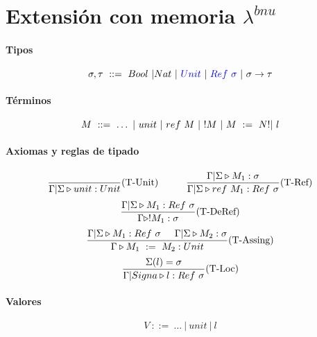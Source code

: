 \documentclass[10pt,a4paper]{article}
\begin{document}
\newpage
\section{Extensión con memoria $\lambda^{bnu}$}
\paragraph{Tipos}
$$\sigma, \tau ~::=~ Bool~|Nat~|~\color{blue}Unit\color{black}~|~\color{blue}Ref~\sigma\color{black}~|~\sigma\to\tau$$

\paragraph{Términos}

$$ M~::=~ \dots~|~unit~|~ref~M~|~!M~|~M~:=~N!|~    l$$

\paragraph{Axiomas y reglas de tipado}
\begin{equation*}
\frac{}{\Gamma|\Sigma\triangleright unit : Unit}(\text{T-Unit})\hspace*{1cm}\frac{\Gamma|\Sigma\triangleright M_1 : \sigma}{\Gamma|\Sigma\triangleright ref~M_1 : Ref~\sigma}(\text{T-Ref})
\end{equation*}
\vspace*{5mm}
\begin{equation*}
\frac{\Gamma|\Sigma\triangleright M_1 : Ref~\sigma}{\Gamma\triangleright !M_1 : \sigma}(\text{T-DeRef})
\end{equation*}
\vspace*{5mm}
\begin{equation*}
\frac{\Gamma|\Sigma\triangleright M_1 : Ref~\sigma\hspace*{5mm}\Gamma|\Sigma\triangleright M_2 : \sigma}{\Gamma\triangleright M_1~:=~M_2 : Unit}(\text{T-Assing})
\end{equation*}
\vspace*{5mm}
\begin{equation*}
\frac{\Sigma(l) = \sigma}{\Gamma|Signa\triangleright l : Ref~\sigma}(\text{T-Loc})
\end{equation*}

\paragraph{Valores}
$$V~::=~\dots~|~unit~|~l$$
\end{document}
